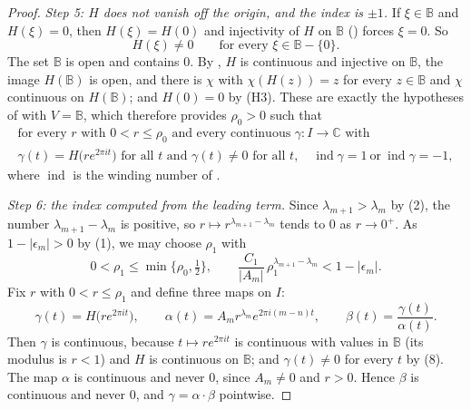 \begin{proof}
\emph{Step 5: $H$ does not vanish off the origin, and the index is $\pm1$.}
If $\xi\in\mathbb{B}$ and $H(\xi)=0$, then $H(\xi)=H(0)$ and injectivity of
$H$ on $\mathbb{B}$ () forces $\xi=0$.  So
\begin{equation}\tag{8}
  H(\xi)\neq0\qquad\text{for every }\xi\in\mathbb{B}-\{0\}.
\end{equation}
The set $\mathbb{B}$ is open and contains $0$.  By ,
$H$ is continuous and injective on $\mathbb{B}$, the image $H(\mathbb{B})$ is
open, and there is $\chi$ with $\chi(H(z))=z$ for every $z\in\mathbb{B}$ and
$\chi$ continuous on $H(\mathbb{B})$; and $H(0)=0$ by (H3).  These are exactly
the hypotheses of  with $V=\mathbb{B}$, which
therefore provides $\rho_0>0$ such that
\begin{equation}\tag{9}
  \begin{gathered}
  \text{for every }r\text{ with }0<r\le\rho_0\text{ and every continuous }
  \gamma\colon I\to\mathbb{C}\text{ with}\\
  \gamma(t)=H\bigl(re^{2\pi it}\bigr)\text{ for all }t\text{ and }
  \gamma(t)\neq0\text{ for all }t,\quad
  \operatorname{ind}\gamma=1\ \text{or}\ \operatorname{ind}\gamma=-1,
  \end{gathered}
\end{equation}
where $\operatorname{ind}$ is the winding number of .

\emph{Step 6: the index computed from the leading term.}  Since
$\lambda_{m+1}>\lambda_m$ by (2), the number $\lambda_{m+1}-\lambda_m$ is
positive, so $r\mapsto r^{\lambda_{m+1}-\lambda_m}$ tends to $0$ as
$r\to0^{+}$.  As $1-|\epsilon_m|>0$ by (1), we may choose $\rho_1$ with
\begin{equation}\tag{10}
  0<\rho_1\le\min\bigl\{\rho_0,\tfrac12\bigr\},\qquad
  \frac{C_1}{|A_m|}\,\rho_1^{\lambda_{m+1}-\lambda_m}<1-|\epsilon_m| .
\end{equation}
Fix $r$ with $0<r\le\rho_1$ and define three maps on $I$:
\[
  \gamma(t)=H\bigl(re^{2\pi it}\bigr),\qquad
  \alpha(t)=A_mr^{\lambda_m}e^{2\pi i(m-n)t},\qquad
  \beta(t)=\frac{\gamma(t)}{\alpha(t)} .
\]
Then $\gamma$ is continuous, because $t\mapsto re^{2\pi it}$ is continuous with
values in $\mathbb{B}$ (its modulus is $r<1$) and $H$ is continuous on
$\mathbb{B}$; and $\gamma(t)\neq0$ for every $t$ by (8).  The map $\alpha$ is
continuous and never $0$, since $A_m\neq0$ and $r>0$.  Hence $\beta$ is
continuous and never $0$, and $\gamma=\alpha\cdot\beta$ pointwise.


\end{proof}
